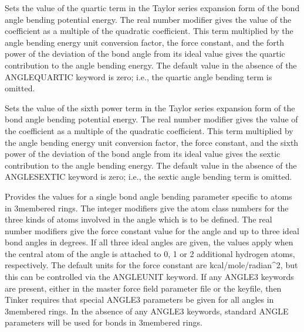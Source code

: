 \documentclass[letterpaper,11pt,english]{sphinxmanual}
\begin{document}
\ignorespaces {}\label{\detokenize{text/keywords:key-angle-quartic}}\begin{description}
\sphinxAtStartPar
Sets the value of the quartic term in the Taylor series expansion form of the bond angle bending potential energy. The real number modifier gives the value of the coefficient as a multiple of the quadratic coefficient. This term multiplied by the angle bending energy unit conversion factor, the force constant, and the forth power of the deviation of the bond angle from its ideal value gives the quartic contribution to the angle bending energy. The default value in the absence of the ANGLE\sphinxhyphen{}QUARTIC keyword is zero; i.e., the quartic angle bending term is omitted.

\end{description}

\ignorespaces {}\label{\detokenize{text/keywords:key-angle-sextic}}\begin{description}
\sphinxAtStartPar
Sets the value of the sixth power term in the Taylor series expansion form of the bond angle bending potential energy. The real number modifier gives the value of the coefficient as a multiple of the quadratic coefficient. This term multiplied by the angle bending energy unit conversion factor, the force constant, and the sixth power of the deviation of the bond angle from its ideal value gives the sextic contribution to the angle bending energy. The default value in the absence of the ANGLE\sphinxhyphen{}SEXTIC keyword is zero; i.e., the sextic angle bending term is omitted.

\end{description}

\ignorespaces {}\label{\detokenize{text/keywords:key-angle3}}\begin{description}
\sphinxAtStartPar
Provides the values for a single bond angle bending parameter specific to atoms in 3\sphinxhyphen{}membered rings. The integer modifiers give the atom class numbers for the three kinds of atoms involved in the angle which is to be defined. The real number modifiers give the force constant value for the angle and up to three ideal bond angles in degrees. If all three ideal angles are given, the values apply when the central atom of the angle is attached to 0, 1 or 2 additional hydrogen atoms, respectively. The default units for the force constant are kcal/mole/radian\textasciicircum{}2, but this can be controlled via the ANGLEUNIT keyword. If any ANGLE3 keywords are present, either in the master force field parameter file or the keyfile, then Tinker requires that special ANGLE3 parameters be given for all angles in 3\sphinxhyphen{}membered rings. In the absence of any ANGLE3 keywords, standard ANGLE parameters will be used for bonds in 3\sphinxhyphen{}membered rings.

\end{description}
\end{document}
